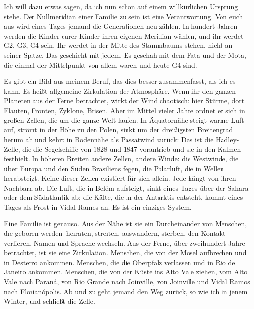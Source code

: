\documentclass[
  ngerman,
  11pt,
  openany]{book}
\begin{document}
Ich will dazu etwas sagen, da ich nun schon auf einem willkürlichen
Ursprung stehe. Der Nullmeridian einer Familie zu sein ist eine
Verantwortung. Von euch aus wird eines Tages jemand die Generationen neu
zählen. In hundert Jahren werden die Kinder eurer Kinder ihren eigenen
Meridian wählen, und ihr werdet G2, G3, G4 sein. Ihr werdet in der Mitte
des Stammbaums stehen, nicht an seiner Spitze. Das geschieht mit jedem.
Es geschah mit dem Fata und der Mota, die einmal der Mittelpunkt von
allem waren und heute G4 sind.

Es gibt ein Bild aus meinem Beruf, das dies besser zusammenfasst, als
ich es kann. Es heißt allgemeine Zirkulation der Atmosphäre. Wenn ihr
den ganzen Planeten aus der Ferne betrachtet, wirkt der Wind chaotisch:
hier Stürme, dort Flauten, Fronten, Zyklone, Brisen. Aber im Mittel
vieler Jahre ordnet er sich in großen Zellen, die um die ganze Welt
laufen. In Äquatornähe steigt warme Luft auf, strömt in der Höhe zu den
Polen, sinkt um den dreißigsten Breitengrad herum ab und kehrt in
Bodennähe als Passatwind zurück: Das ist die Hadley-Zelle, die die
Segelschiffe von 1828 und 1847 vorantrieb und sie in den Kalmen
festhielt. In höheren Breiten andere Zellen, andere Winde: die
Westwinde, die über Europa und den Süden Brasiliens fegen, die
Polarluft, die in Wellen herabsteigt. Keine dieser Zellen existiert für
sich allein. Jede hängt von ihren Nachbarn ab. Die Luft, die in Belém
aufsteigt, sinkt eines Tages über der Sahara oder dem Südatlantik ab;
die Kälte, die in der Antarktis entsteht, kommt eines Tages als Frost in
Vidal Ramos an. Es ist ein einziges System.

Eine Familie ist genauso. Aus der Nähe ist sie ein Durcheinander von
Menschen, die geboren werden, heiraten, streiten, auswandern, sterben,
den Kontakt verlieren, Namen und Sprache wechseln. Aus der Ferne, über
zweihundert Jahre betrachtet, ist sie eine Zirkulation. Menschen, die
von der Mosel aufbrechen und in Desterro ankommen. Menschen, die die
Oberpfalz verlassen und in Rio de Janeiro ankommen. Menschen, die von
der Küste ins Alto Vale ziehen, vom Alto Vale nach Paraná, von Rio
Grande nach Joinville, von Joinville und Vidal Ramos nach Florianópolis.
Ab und zu geht jemand den Weg zurück, so wie ich in jenem Winter, und
schließt die Zelle.
\end{document}
